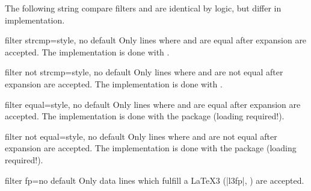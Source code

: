 \documentclass[a4paper,11pt]{ltxdoc}
\begin{document}
The following string compare filters  and
 are identical by logic, but differ in implementation.

\begin{docCsvKey}{filter strcmp}{=}{style, no default}
  Only lines where  and  are equal after expansion
  are accepted.
  The implementation is done with .
\begin{dispExample}
\end{dispExample}
\end{docCsvKey}


\begin{docCsvKey}{filter not strcmp}{=}{style, no default}
  Only lines where  and  are not equal after expansion
  are accepted.
  The implementation is done with .
\end{docCsvKey}


\begin{docCsvKey}{filter equal}{=}{style, no default}
  Only lines where  and  are equal after expansion
  are accepted.
  The implementation is done with the  package (loading required!).
\end{docCsvKey}


\begin{docCsvKey}{filter not equal}{=}{style, no default}
  Only lines where  and  are not equal after expansion
  are accepted.
  The implementation is done with the  package (loading required!).
\end{docCsvKey}


\begin{docCsvKey}[][doc new=2021-06-25]{filter fp}{=}{no default}
  Only data lines which fulfill a \LaTeX3 
    (|l3fp|, ) are accepted.
\begin{dispExample}
\end{dispExample}
\end{docCsvKey}
\end{document}
